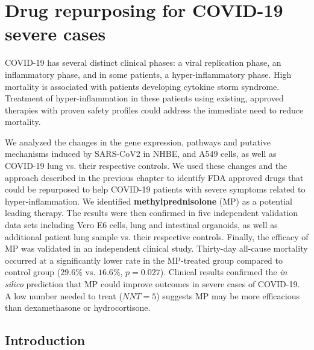 \newcommand*{\MyIndent}{\hspace*{0.5cm}}

\section{Drug repurposing for COVID-19 severe cases}
\label{chap:COVID_Study}

COVID-19 has several distinct clinical phases: a viral replication phase, an inflammatory phase, and in some patients, a hyper-inflammatory phase. High mortality is associated with patients developing cytokine storm syndrome. 
Treatment of hyper-inflammation in these patients using existing, approved therapies with proven safety profiles could address the immediate need to reduce mortality. 

We analyzed  the changes in the gene expression, pathways and putative mechanisms induced by SARS-CoV2 in  NHBE, and A549 cells, as well as COVID-19 lung vs. their respective controls. We used these changes and the approach described in the previous chapter to identify FDA approved drugs that could be repurposed to help COVID-19 patients with severe symptoms related to hyper-inflammation. We identified \textbf{methylprednisolone} (MP) as a potential leading therapy. 
The results were then confirmed in five independent validation data sets including Vero E6 cells, lung and intestinal organoids, as well as additional patient lung sample vs. their respective controls. Finally, the efficacy of MP was validated in an independent clinical study. 
Thirty-day all-cause mortality occurred at a significantly lower rate in the MP-treated group compared to control group ($29.6\%$ vs. $16.6\%$, $p=0.027$). Clinical results confirmed the \emph{in silico} prediction that MP could improve outcomes in severe cases of COVID-19.  A low number needed to treat ($NNT=5$) suggests MP may be more efficacious than dexamethasone or hydrocortisone. 

\subsection{Introduction}

